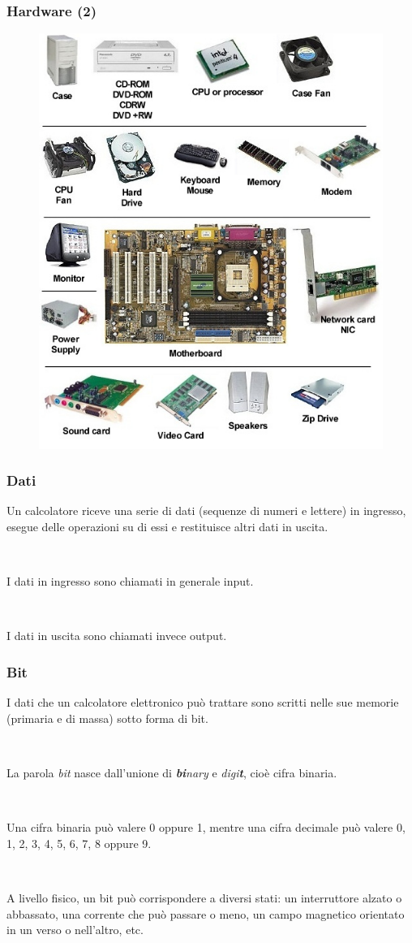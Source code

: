 \documentclass[handout]{beamer}
\begin{document}
\begin{frame}
\frametitle{Hardware (2)}
\begin{figure}
  \includegraphics[width=.5\columnwidth]{img/hardware2.jpg}
\end{figure}
\end{frame}





\begin{frame}
\frametitle{Dati}
Un calcolatore riceve una serie di dati (sequenze di numeri e lettere) in ingresso, \alert<1>{esegue delle operazioni} su di essi e restituisce altri dati in uscita.\pause

~

I dati in ingresso sono chiamati in generale \alert<2>{input}.\pause

~

I dati in uscita sono chiamati invece \alert<3>{output}.
\end{frame}


\begin{frame}
\frametitle{Bit}
I dati che un calcolatore elettronico può trattare sono scritti nelle sue memorie (primaria e di massa) sotto forma di \alert<1>{bit}.\pause

~

La parola \emph{bit} nasce dall'unione di \emph{\textbf{bi}nary} e \emph{digi\textbf{t}}, cioè \alert<2>{cifra binaria}.\pause

~


\alert<3>{Una cifra binaria può valere 0 oppure 1}, mentre una cifra decimale può valere 0, 1, 2, 3, 4, 5, 6, 7, 8 oppure 9.\pause

~

A \alert<4>{livello fisico}, un bit può corrispondere a diversi stati: un interruttore alzato o abbassato, una corrente che può passare o meno, un campo magnetico orientato in un verso o nell'altro, etc.
\begin{center}
  \href{https://www.youtube.com/watch?v=zELAfmp3fXY}{}
\end{center}
\end{frame}
\end{document}
